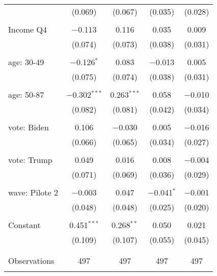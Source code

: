 \begin{tabular}{@{\extracolsep{5pt}}lcccc}
  & (0.069) & (0.067) & (0.035) & (0.028) \\ 
  & & & & \\ 
 Income Q4 & $-$0.113 & 0.116 & 0.035 & 0.009 \\ 
  & (0.074) & (0.073) & (0.038) & (0.031) \\ 
  & & & & \\ 
 age: 30-49 & $-$0.126$^{*}$ & 0.083 & $-$0.013 & 0.005 \\ 
  & (0.075) & (0.074) & (0.038) & (0.031) \\ 
  & & & & \\ 
 age: 50-87 & $-$0.302$^{***}$ & 0.263$^{***}$ & 0.058 & $-$0.010 \\ 
  & (0.082) & (0.081) & (0.042) & (0.034) \\ 
  & & & & \\ 
 vote: Biden & 0.106 & $-$0.030 & 0.005 & $-$0.016 \\ 
  & (0.066) & (0.065) & (0.034) & (0.027) \\ 
  & & & & \\ 
 vote: Trump & 0.049 & 0.016 & 0.008 & $-$0.004 \\ 
  & (0.071) & (0.069) & (0.036) & (0.029) \\ 
  & & & & \\ 
 wave: Pilote 2 & $-$0.003 & 0.047 & $-$0.041$^{*}$ & $-$0.001 \\ 
  & (0.048) & (0.048) & (0.025) & (0.020) \\ 
  & & & & \\ 
 Constant & 0.451$^{***}$ & 0.268$^{**}$ & 0.050 & 0.021 \\ 
  & (0.109) & (0.107) & (0.055) & (0.045) \\ 
  & & & & \\ 
\hline \\[-1.8ex] 

Observations & 497 & 497 & 497 & 497 \\ 
\hline 
\hline \\[-1.8ex] 
\end{tabular} 
